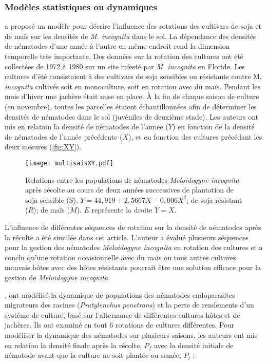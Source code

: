 	
\subsubsection{Modèles statistiques ou dynamiques}

	  \citet{Kinloch1986} a proposé un modèle  pour décrire l'influence des rotations des cultivars de soja et de maïs  sur les densités de  \textit{M. incognita} dans le sol.
La dépendance des densités de nématodes d'une année à l'autre en même endroit rend la dimension temporelle très importante.  Des données sur la rotation des cultures ont été collectées de 1972 à 1980 sur un site infesté par \textit{M. incognita} en Floride.  Les cultures d'été consistaient à des cultivars de soja sensibles ou résistants contre M. \textit{incognita} cultivés soit en monoculture, soit en rotation avec du maïs. Pendant les mois d'hiver une jachère était mise en place. À la fin de chaque saison de culture (en novembre), toutes les parcelles étaient échantillonnées afin de déterminer les densités de nématodes dans le sol (juvéniles de deuxième stade). Les auteurs ont mis en relation la densité de nématodes de l'année ($Y$) en fonction de la densité  de nématodes de l'année précédente ($X$), et en fonction des cultures précédant les deux mesures (\autoref{fig:XY}).
	
	\begin{figure}[H]		
		\centering	
		    \texttt{[image: multisaisXY.pdf]}
			\caption[
			Relations entre les populations de nématodes \textit{Meloidogyne incognita} après récolte   au cours de  
			deux années successives de plantation.]{
			Relations entre les populations de nématodes \textit{Meloidogyne incognita} après récolte au cours de deux 
			années successives de plantation de soja sensible (S), $Y = 44,919 + 2,5667X - 0,006X^2$; de soja résistant 
			($R$); de maïs ($M$). $E$ représente la droite $Y=X$.
			\label{fig:XY}}
	\end{figure}
	
	 L'influence de  différentes séquences de rotation sur la densité de nématodes après la récolte a été simulée dans cet article.  
L'auteur a  évalué plusieurs séquences  pour la gestion  des  nématodes \textit{Meloidogyne incognita} en rotation des cultures et a conclu qu'une rotation occasionnelle avec du maïs ou tous autres cultures mauvais hôtes avec des hôtes résistants pourrait être une solution efficace  pour la gestion de \textit{Meloidogyne incognita}.
	
	\citet{Vandenberg2005}, ont modélisé la dynamique de  populations des  nématodes endoparasites migrateurs des racines  (\textit{Pratylenchus penetrans}) et la perte de rendements d'un système de culture, basé sur l'alternance  de différentes cultures hôtes  et de jachères. Ils ont examiné en tout 6 rotations de cultures  différentes.
Pour modéliser la dynamique des nématodes sur plusieurs saisons, les auteurs ont mis en relation la densité finale après la récolte, $P_f$  avec la densité initiale de nématode  avant que la culture ne soit plantée ou semée,  $P_i$  :
	
